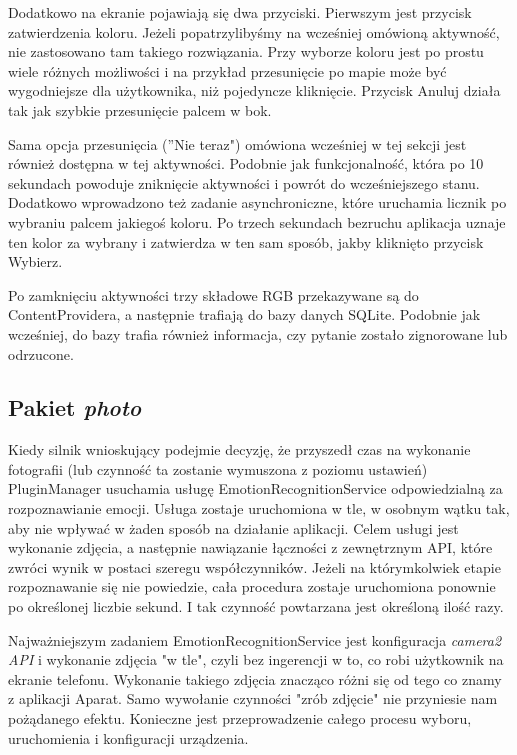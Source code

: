 Dodatkowo na ekranie pojawiają się dwa przyciski. Pierwszym jest przycisk zatwierdzenia koloru. Jeżeli popatrzylibyśmy na wcześniej omówioną aktywność, nie zastosowano tam takiego rozwiązania. Przy wyborze koloru jest po prostu wiele różnych możliwości i na przykład przesunięcie po mapie może być wygodniejsze dla użytkownika, niż pojedyncze kliknięcie. Przycisk Anuluj działa tak jak szybkie przesunięcie palcem w bok.

Sama opcja przesunięcia (''Nie teraz") omówiona wcześniej w tej sekcji jest również dostępna w tej aktywności. Podobnie jak funkcjonalność, która po 10 sekundach powoduje zniknięcie aktywności i powrót do wcześniejszego stanu. Dodatkowo wprowadzono też zadanie asynchroniczne, które uruchamia licznik po wybraniu palcem jakiegoś koloru. Po trzech sekundach bezruchu aplikacja uznaje ten kolor za wybrany i zatwierdza w ten sam sposób, jakby kliknięto przycisk Wybierz.

Po zamknięciu aktywności trzy składowe RGB przekazywane są do ContentProvidera, a następnie trafiają do bazy danych SQLite. Podobnie jak wcześniej, do bazy trafia również informacja, czy pytanie zostało zignorowane lub odrzucone.


\subsection{Pakiet \textit{photo}}

Kiedy silnik wnioskujący podejmie decyzję, że przyszedł czas na wykonanie fotografii (lub czynność ta zostanie wymuszona z poziomu ustawień) PluginManager usuchamia usługę EmotionRecognitionService odpowiedzialną za rozpoznawianie emocji. Usługa zostaje uruchomiona w tle, w osobnym wątku tak, aby nie wpływać w żaden sposób na działanie aplikacji. Celem usługi jest wykonanie zdjęcia, a następnie nawiązanie łączności z zewnętrznym API, które zwróci wynik w postaci szeregu współczynników. Jeżeli na którymkolwiek etapie rozpoznawanie się nie powiedzie, cała procedura zostaje uruchomiona ponownie po określonej liczbie sekund. I tak czynność powtarzana jest określoną ilość razy.

Najważniejszym zadaniem EmotionRecognitionService jest konfiguracja \textit{camera2 API} i wykonanie zdjęcia "w tle", czyli bez ingerencji w to, co robi użytkownik na ekranie telefonu. Wykonanie takiego zdjęcia znacząco różni się od tego co znamy z aplikacji Aparat. Samo wywołanie czynności "zrób zdjęcie" nie przyniesie nam pożądanego efektu. Konieczne jest przeprowadzenie całego procesu wyboru, uruchomienia i konfiguracji urządzenia. 

